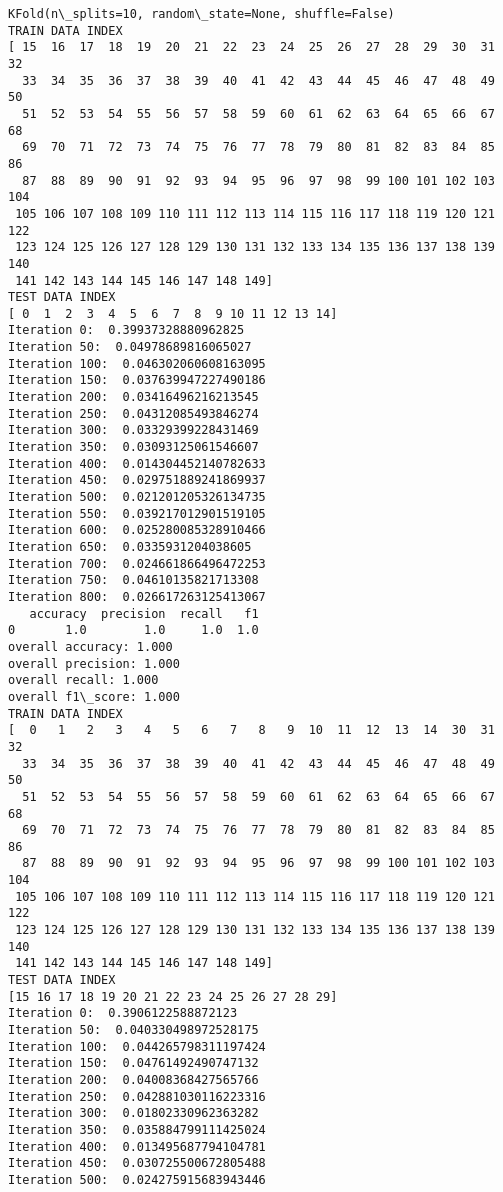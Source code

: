\documentclass[11pt]{article}
\begin{document}
    \begin{Verbatim}[commandchars=\\\{\}]
KFold(n\_splits=10, random\_state=None, shuffle=False)
TRAIN DATA INDEX
[ 15  16  17  18  19  20  21  22  23  24  25  26  27  28  29  30  31  32
  33  34  35  36  37  38  39  40  41  42  43  44  45  46  47  48  49  50
  51  52  53  54  55  56  57  58  59  60  61  62  63  64  65  66  67  68
  69  70  71  72  73  74  75  76  77  78  79  80  81  82  83  84  85  86
  87  88  89  90  91  92  93  94  95  96  97  98  99 100 101 102 103 104
 105 106 107 108 109 110 111 112 113 114 115 116 117 118 119 120 121 122
 123 124 125 126 127 128 129 130 131 132 133 134 135 136 137 138 139 140
 141 142 143 144 145 146 147 148 149]
TEST DATA INDEX
[ 0  1  2  3  4  5  6  7  8  9 10 11 12 13 14]
Iteration 0:  0.39937328880962825
Iteration 50:  0.04978689816065027
Iteration 100:  0.046302060608163095
Iteration 150:  0.037639947227490186
Iteration 200:  0.03416496216213545
Iteration 250:  0.04312085493846274
Iteration 300:  0.03329399228431469
Iteration 350:  0.03093125061546607
Iteration 400:  0.014304452140782633
Iteration 450:  0.029751889241869937
Iteration 500:  0.021201205326134735
Iteration 550:  0.039217012901519105
Iteration 600:  0.025280085328910466
Iteration 650:  0.0335931204038605
Iteration 700:  0.024661866496472253
Iteration 750:  0.04610135821713308
Iteration 800:  0.026617263125413067
   accuracy  precision  recall   f1
0       1.0        1.0     1.0  1.0
overall accuracy: 1.000
overall precision: 1.000
overall recall: 1.000
overall f1\_score: 1.000
TRAIN DATA INDEX
[  0   1   2   3   4   5   6   7   8   9  10  11  12  13  14  30  31  32
  33  34  35  36  37  38  39  40  41  42  43  44  45  46  47  48  49  50
  51  52  53  54  55  56  57  58  59  60  61  62  63  64  65  66  67  68
  69  70  71  72  73  74  75  76  77  78  79  80  81  82  83  84  85  86
  87  88  89  90  91  92  93  94  95  96  97  98  99 100 101 102 103 104
 105 106 107 108 109 110 111 112 113 114 115 116 117 118 119 120 121 122
 123 124 125 126 127 128 129 130 131 132 133 134 135 136 137 138 139 140
 141 142 143 144 145 146 147 148 149]
TEST DATA INDEX
[15 16 17 18 19 20 21 22 23 24 25 26 27 28 29]
Iteration 0:  0.3906122588872123
Iteration 50:  0.040330498972528175
Iteration 100:  0.044265798311197424
Iteration 150:  0.04761492490747132
Iteration 200:  0.04008368427565766
Iteration 250:  0.042881030116223316
Iteration 300:  0.01802330962363282
Iteration 350:  0.035884799111425024
Iteration 400:  0.013495687794104781
Iteration 450:  0.030725500672805488
Iteration 500:  0.024275915683943446

\end{Verbatim}
\end{document}

